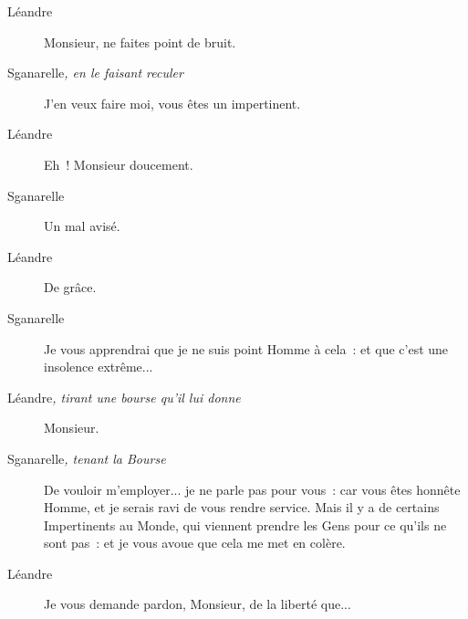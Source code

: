 \documentclass[french,twoside]{book} %
\begin{document}
 \begin{description} \item[Léandre] 

Monsieur, ne faites point de bruit.\end{description}
 \begin{description} \item[Sganarelle\textit{, en le faisant reculer}\par
] 

J’en veux faire moi, vous êtes un impertinent.\end{description}
 \begin{description} \item[Léandre] 

Eh ! Monsieur doucement.\end{description}
 \begin{description} \item[Sganarelle] 

Un mal avisé.\end{description}
 \begin{description} \item[Léandre] 

De grâce.\end{description}
 \begin{description} \item[Sganarelle] 

Je vous apprendrai que je ne suis point Homme à cela : et que c’est une insolence extrême...\end{description}
 \begin{description} \item[Léandre\textit{, tirant une bourse qu’il lui donne}\par
] 

Monsieur.\end{description}
 \begin{description} \item[Sganarelle\textit{, tenant la Bourse}\par
] 

De vouloir m’employer... je ne parle pas pour vous : car vous êtes honnête Homme, et je serais ravi de vous rendre service. Mais il y a de certains Impertinents au Monde, qui viennent prendre les Gens pour ce qu’ils ne sont pas : et je vous avoue que cela me met en colère.\end{description}
 \begin{description} \item[Léandre] 

Je vous demande pardon, Monsieur, de la liberté que...\end{description}
\end{document}
